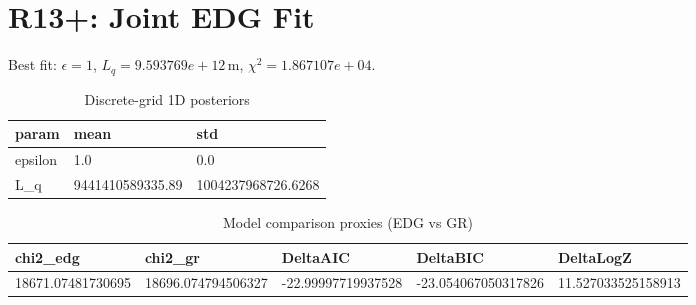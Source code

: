 \section{R13+: Joint EDG Fit}
Best fit: $\epsilon = 1$, $L_q = 9.593769e+12\,\mathrm{m}$, $\chi^2 = 1.867107e+04$.
\begin{table}[h!]
\centering
\caption{Discrete-grid 1D posteriors}
\label{tab:r13p_marg}
\begin{tabular}{l | l | l}
\hline
param & mean & std \\
\hline
epsilon & 1.0 & 0.0 \\
L_q & 9441410589335.89 & 1004237968726.6268 \\
\hline
\end{tabular}
\end{table}

\begin{table}[h!]
\centering
\caption{Model comparison proxies (EDG vs GR)}
\label{tab:r13p_model}
\begin{tabular}{l | l | l | l | l}
\hline
chi2_edg & chi2_gr & DeltaAIC & DeltaBIC & DeltaLogZ \\
\hline
18671.07481730695 & 18696.074794506327 & -22.99997719937528 & -23.054067050317826 & 11.527033525158913 \\
\hline
\end{tabular}
\end{table}

